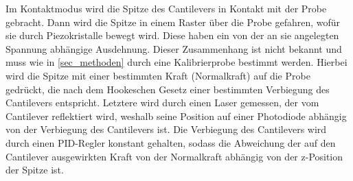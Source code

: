 \documentclass[
	a4paper,
	12pt,
	pagesize,
	ngerman
]{scrartcl}
\begin{document}
	Im Kontaktmodus wird die Spitze des Cantilevers in Kontakt mit der Probe gebracht.
	Dann wird die Spitze in einem Raster über die Probe gefahren, wofür sie durch Piezokristalle bewegt wird.
	Diese haben ein von der an sie angelegten Spannung abhängige Ausdehnung.
	Dieser Zusammenhang ist nicht bekannt und muss wie in \cref{sec_methoden} durch eine Kalibrierprobe bestimmt werden.
	Hierbei wird die Spitze mit einer bestimmten Kraft (Normalkraft) auf die Probe gedrückt, die nach dem Hookeschen Gesetz einer bestimmten Verbiegung des Cantilevers entspricht.
	Letztere wird durch einen Laser gemessen, der vom Cantilever  reflektiert wird, weshalb seine Position auf einer Photodiode abhängig von der Verbiegung des Cantilevers ist.%
	Die Verbiegung des Cantilevers wird durch einen PID-Regler konstant gehalten, sodass die Abweichung der auf den Cantilever ausgewirkten Kraft von der Normalkraft abhängig von der z-Position der Spitze ist. %
\end{document}
